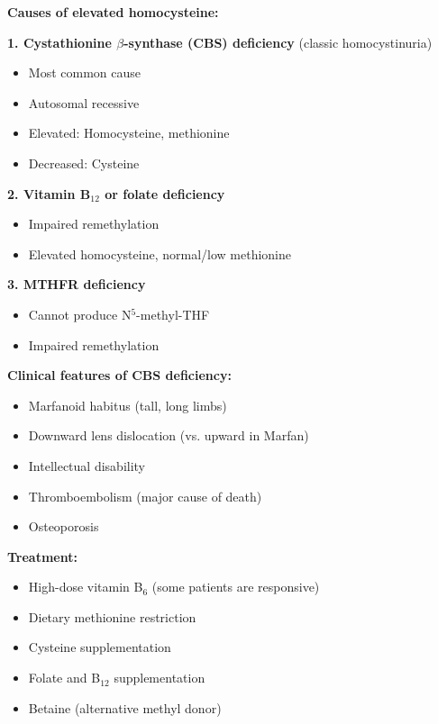 \begin{tcolorbox}[colback=red!5, colframe=red!70!black, title=\textbf{Clinical Correlation: Homocystinuria}]
\textbf{Causes of elevated homocysteine:}

\textbf{1. Cystathionine $\beta$-synthase (CBS) deficiency} (classic homocystinuria)
\begin{itemize}
    \item Most common cause
    \item Autosomal recessive
    \item Elevated: Homocysteine, methionine
    \item Decreased: Cysteine
\end{itemize}

\textbf{2. Vitamin B$_{12}$ or folate deficiency}
\begin{itemize}
    \item Impaired remethylation
    \item Elevated homocysteine, normal/low methionine
\end{itemize}

\textbf{3. MTHFR deficiency}
\begin{itemize}
    \item Cannot produce N$^5$-methyl-THF
    \item Impaired remethylation
\end{itemize}

\textbf{Clinical features of CBS deficiency:}
\begin{itemize}
    \item Marfanoid habitus (tall, long limbs)
    \item Downward lens dislocation (vs. upward in Marfan)
    \item Intellectual disability
    \item Thromboembolism (major cause of death)
    \item Osteoporosis
\end{itemize}

\textbf{Treatment:}
\begin{itemize}
    \item High-dose vitamin B$_6$ (some patients are responsive)
    \item Dietary methionine restriction
    \item Cysteine supplementation
    \item Folate and B$_{12}$ supplementation
    \item Betaine (alternative methyl donor)
\end{itemize}
\end{tcolorbox}

